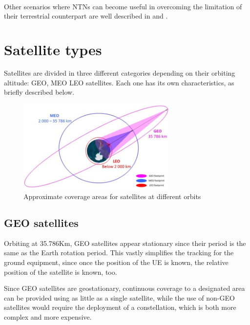 \paragraph{} Other scenarios where \ac{NTNs} can become useful in overcoming the limitation of their terrestrial counterpart are well described in \cite{ntn-6g-era-challenges-giordani} and \cite{potential-multilayered-nierarchical-ntn-wang}.

\section{Satellite types}
\label{sec:satellite-types}
Satellites are divided in three different categories depending on their orbiting altitude: \ac{GEO}, \ac{MEO} \ac{LEO} satellites. Each one has its own characteristics, as briefly described below.


\begin{figure}[ht]
    \centering
    \includegraphics[width=0.7\textwidth]{res/satellite-coverages.jpg}
    \caption{Approximate coverage areas for satellites at different orbits\cite{sustainable-sat-com-6g}}
    \label{fig:satellite_coverages}
\end{figure}

\subsection{GEO satellites}
Orbiting at 35.786Km, \ac{GEO} satellites appear stationary since their period is the same as the Earth rotation period. This vastly simplifies the tracking for the ground equipment, since once the position of the \ac{UE} is known, the relative position of the satellite is known, too.
    
Since \ac{GEO} satellites are geostationary, continuous coverage to a designated area can be provided using as little as a single satellite, while the use of non-\ac{GEO} satellites would require the deployment of a constellation, which is both more complex and more expensive.

